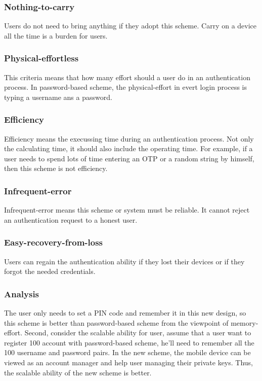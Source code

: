 \begin{CJK}{Bg5}{bsmi}
\subsubsection{Nothing-to-carry}

Users do not need to bring anything if they adopt this scheme. Carry on a device all the time is a burden for users.

\subsubsection{Physical-effortless}

This criteria means that how many effort should a user do in an authentication process. In password-based scheme, the physical-effort in evert login process is typing a username ans a password.

\subsubsection{Efficiency}

Efficiency means the execussing time during an authentication process. Not only the calculating time, it should also include the operating time. For example, if a user needs to spend lots of time entering an OTP or a random string by himself, then this scheme is not efficiency.

\subsubsection{Infrequent-error}

Infrequent-error means this scheme or system must be reliable. It cannot reject an authentication request to a honest user.

\subsubsection{Easy-recovery-from-loss}

Users can regain the authentication ability if they lost their devices or if they forgot the needed credentials.

\subsubsection{Analysis}

The user only needs to set a PIN code and remember it in this new design, so this scheme is better than password-based scheme from the viewpoint of memory-effort. Second, consider the scalable ability for user, assume that a user want to register 100 account with password-based scheme, he'll need to remember all the 100 username and password pairs. In the new scheme, the mobile device can be viewed as an account manager and help user managing their private keys. Thus, the scalable ability of the new scheme is better.


\end{CJK}
